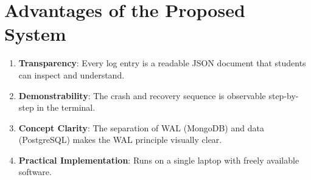 \section{Advantages of the Proposed System}

\begin{enumerate}
  \item \textbf{Transparency}: Every log entry is a readable JSON document
        that students can inspect and understand.
  \item \textbf{Demonstrability}: The crash and recovery sequence is
        observable step-by-step in the terminal.
  \item \textbf{Concept Clarity}: The separation of WAL (MongoDB) and data
        (PostgreSQL) makes the WAL principle visually clear.
  \item \textbf{Practical Implementation}: Runs on a single laptop with
        freely available software.
\end{enumerate}
